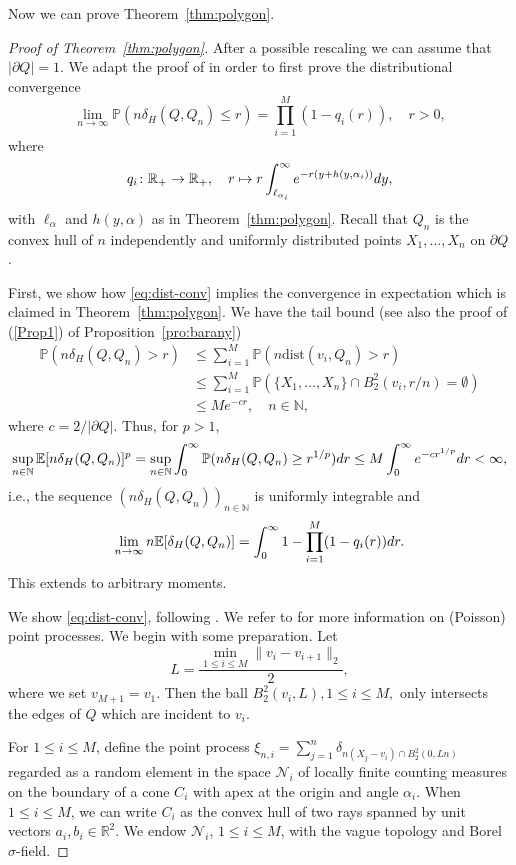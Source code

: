 \documentclass[a4paper,12pt]{article}
\theoremstyle{definition}
\newcommand{\IE}{\mathbb{E}}
\newcommand{\IN}{\mathbb{N}}
\newcommand{\IP}{\mathbb{P}}
\newcommand{\IR}{\mathbb{R}}
\newcommand{\dd}{{\rm d}}
\newcommand{\dist}{\mathrm{dist}}
\begin{document}
Now we can prove Theorem~\ref{thm:polygon}.

\begin{proof}[Proof of Theorem~\ref{thm:polygon}]

After a possible rescaling we can assume that $|\partial Q|=1$. We adapt the proof of \cite[Thm. 3]{BHB98} in order to first prove the distributional convergence
\begin{equation} \label{eq:dist-conv}
	\lim_{n\to\infty}\IP(n \delta_H(Q,Q_n)\le r)
= \prod_{i=1}^M (1-q_i(r)), \quad r>0,
\end{equation}
where
\[
q_i\colon \IR_+\to \IR_+,\quad
r\mapsto r\int_{\ell_{\alpha_i}}^{\infty}e^{-r(y+h(y,\alpha_i))}\dd y, 
\]
with $\ell_{\alpha}$ and $h(y,\alpha)$  as in Theorem~\ref{thm:polygon}. Recall that $Q_n$ is the convex hull of $n$ independently and uniformly distributed points $X_1,\dots,X_n$ on $\partial Q$.

First, we show how \eqref{eq:dist-conv} implies the convergence in expectation which is claimed in Theorem~\ref{thm:polygon}. We have the tail bound (see also the proof of (\ref{Prop1}) of  Proposition~\ref{pro:barany})
\begin{align*}
\IP(n\delta_H(Q,Q_n)> r)
&\le \sum_{i=1}^{M}\IP(n\dist(v_i,Q_n)> r)\\
&\le \sum_{i=1}^{M}\IP(\{X_1,\dots,X_n\}\cap B_2^2(v_i,r/n)=\emptyset)\\
&\le M e^{-c r}, \quad n\in\IN,
\end{align*}
where $c=2/|\partial Q|$.  Thus, for $p>1$,
\[
\sup_{n\in\IN}\IE [n\delta_H(Q,Q_n)]^p  
=\sup_{n\in\IN}\int_0^{\infty} \IP(n\delta_H(Q,Q_n)\ge r^{1/p})\dd r
\le M\int_0^{\infty} e^{-cr^{1/p}}\dd r
<\infty,
\]
i.e., the sequence $(n\delta_H(Q,Q_n))_{n\in\IN}$ is uniformly integrable and 
\[
\lim_{n\to\infty}n\IE[\delta_H(Q,Q_n)]
= \int_0^{\infty} 1-\prod_{i=1}^M (1-q_i(r))\dd r.
\]
This extends to arbitrary moments.


We show \eqref{eq:dist-conv}, following \cite{BHB98}. We refer to \cite{LP18} for more information on (Poisson) point processes. We begin with some preparation. Let
\[
L=\frac{\min_{1\le i\le M} \|v_i-v_{i+1}\|_2}{2},
\]
where we set $v_{M+1}=v_1$. Then the ball $B_2^2(v_i,L), 1\le i\le M,$ only intersects the edges of $Q$ which are incident to $v_i$.


For $1\le i\le M$, define the point process $\xi_{n,i}=\sum_{j=1}^{n}\delta_{n(X_j-v_i)\cap B_2^2(0,Ln) }$ regarded as a random element in the space $\mathcal{N}_i$ of locally finite counting measures on the boundary of a cone $C_i$ with apex at the origin and angle $\alpha_i$. When $1\le i\le M$, we can write $C_i$ as the convex hull of two rays spanned by unit vectors $a_i,b_i\in \IR^2$. We endow $\mathcal{N}_i$, $1\le i\le M$, with the vague topology and Borel $\sigma$-field.


\end{proof}
\end{document}

